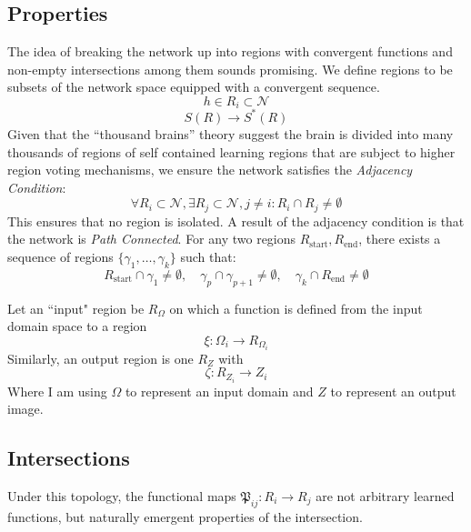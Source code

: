 \documentclass[twocolumn, 10pt]{article}
\begin{document}
\subsection{Properties}
The idea of breaking the network up into regions with convergent functions and non-empty intersections among them sounds promising. We define regions to be subsets of the network space equipped with a convergent sequence. 
\begin{equation}
    h \in R_i \subset \mathcal{N}
\end{equation}
\begin{equation}
    S(R)  \to S^*(R)   
\end{equation}
Given that the ``thousand brains'' theory suggest the brain is divided into many thousands of regions of self contained learning regions that are subject to higher region voting mechanisms, we ensure the network satisfies the \textit{Adjacency Condition}:
\begin{equation}
    \forall R_i \subset \mathcal{N}, \exists R_j \subset \mathcal{N}, j \ne i : R_i \cap R_j \ne \emptyset
\end{equation}
This ensures that no region is isolated. A result of the adjacency condition is that the network is \textit{Path Connected}. For any two regions $R_{\text{start}}, R_{\text{end}}$, there exists a sequence of regions $\{ \gamma_1, \dots, \gamma_k \}$ such that:
\begin{equation}
    R_{\text{start}} \cap \gamma_1 \ne \emptyset, \quad \gamma_p \cap \gamma_{p+1} \ne \emptyset, \quad \gamma_k \cap R_{\text{end}} \ne \emptyset
\end{equation}

Let an ``input" region be $R_\Omega$ on which a function is defined from the input domain space to a region
\begin{equation}
    \xi : \Omega_i \to R_{\Omega_i}
\end{equation}
Similarly, an output region is one $R_Z$ with
\begin{equation}
    \zeta : R_{Z_i} \to Z_i
\end{equation}
Where I am using $\Omega$ to represent an input domain and $Z$ to represent an output image.

\subsection{Intersections}
Under this topology, the functional maps $\mathfrak{P}_{ij}: R_i \to R_j$ are not arbitrary learned functions, but naturally emergent properties of the intersection.
\end{document}
